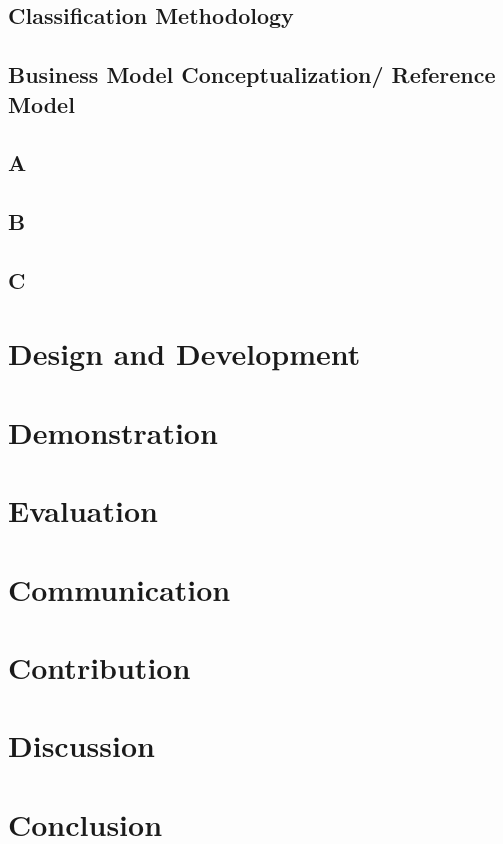 	\section{Classification Methodology}

	\section{Business Model Conceptualization/ Reference Model}
	
	\section{A}
	\section{B}
	\section{C}

\chapter{Design and Development}

\chapter{Demonstration}

\chapter{Evaluation}

\chapter{Communication}

\chapter{Contribution}

\chapter{Discussion}

\chapter{Conclusion}


